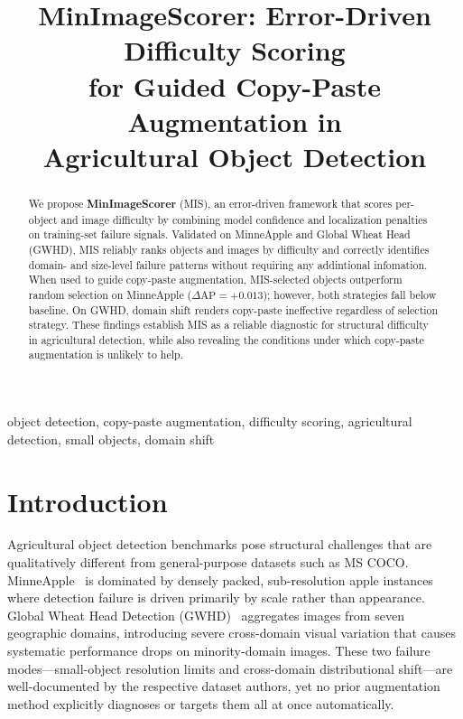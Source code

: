 \documentclass[conference]{IEEEtran}
\begin{document}
\title{MinImageScorer: Error-Driven Difficulty Scoring\\
for Guided Copy-Paste Augmentation in\\
Agricultural Object Detection}


\author{
}

\maketitle

\begin{abstract}
We propose \textbf{MinImageScorer} (MIS), an error-driven framework
that scores per-object and image difficulty by combining model
confidence and localization penalties on training-set failure signals.
Validated on MinneApple and Global Wheat Head (GWHD), MIS reliably
ranks objects and images by difficulty and
correctly identifies domain- and size-level failure patterns
without requiring any addintional infomation.
When used to guide copy-paste augmentation, MIS-selected objects
outperform random selection on MinneApple ($\Delta\mathrm{AP}{=}
{+}0.013$); however, both strategies fall below baseline.
On GWHD, domain shift renders copy-paste ineffective regardless of
selection strategy.
These findings establish MIS as a reliable diagnostic for structural
difficulty in agricultural detection, while also revealing the
conditions under which copy-paste augmentation is unlikely to help.
\end{abstract}

\begin{IEEEkeywords}
object detection, copy-paste augmentation, difficulty scoring,
agricultural detection, small objects, domain shift
\end{IEEEkeywords}

\section{Introduction}

Agricultural object detection benchmarks pose structural challenges
that are qualitatively different from general-purpose datasets such
as MS COCO. MinneApple~\cite{hani2020minneapple} is dominated by
densely packed, sub-resolution apple instances where detection
failure is driven primarily by scale rather than appearance.
Global Wheat Head Detection (GWHD)~\cite{david2021global} aggregates
images from seven geographic domains, introducing severe cross-domain
visual variation that causes systematic performance drops on
minority-domain images.
These two failure modes---small-object resolution limits and
cross-domain distributional shift---are well-documented by the
respective dataset authors, yet no prior augmentation method
explicitly diagnoses or targets them all at once automatically.
\end{document}
